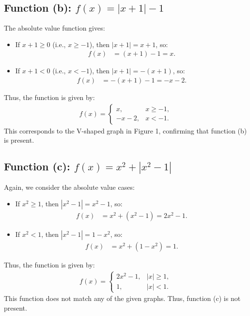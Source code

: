 \documentclass{article}
\begin{document}
\subsection{Function (b): $f(x) = |x + 1| - 1$}

The absolute value function gives:
\begin{itemize}
    \item If $x + 1 \geq 0$ (i.e., $x \geq -1$), then $|x + 1| = x + 1$, so:
    \begin{align*}
        f(x) &= (x + 1) - 1 = x.
    \end{align*}
    \item If $x + 1 < 0$ (i.e., $x < -1$), then $|x + 1| = -(x + 1)$, so:
    \begin{align*}
        f(x) &= -(x + 1) - 1 = -x - 2.
    \end{align*}
\end{itemize}
Thus, the function is given by:
\begin{align*}
    f(x) = \begin{cases} x, & x \geq -1, \\ -x - 2, & x < -1. \end{cases}
\end{align*}
This corresponds to the V-shaped graph in Figure 1, confirming that function (b) is present.

\subsection{Function (c): $f(x) = x^2 + |x^2 - 1|$}

Again, we consider the absolute value cases:
\begin{itemize}
    \item If $x^2 \geq 1$, then $|x^2 - 1| = x^2 - 1$, so:
    \begin{align*}
        f(x) &= x^2 + (x^2 - 1) = 2x^2 - 1.
    \end{align*}
    \item If $x^2 < 1$, then $|x^2 - 1| = 1 - x^2$, so:
    \begin{align*}
        f(x) &= x^2 + (1 - x^2) = 1.
    \end{align*}
\end{itemize}
Thus, the function is given by:
\begin{align*}
    f(x) = \begin{cases} 2x^2 - 1, & |x| \geq 1, \\ 1, & |x| < 1. \end{cases}
\end{align*}
This function does not match any of the given graphs. Thus, function (c) is not present.
\end{document}
